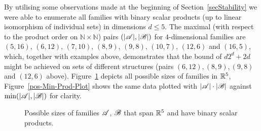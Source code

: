 By utilising some observations made at the beginning of Section~\ref{secStability} we were able to enumerate all families with binary scalar products (up to linear isomorphism of individual sets) in dimensions $d \leq 5$. The maximal (with respect to the product order on $\mathbb{N}\times\mathbb{N}$) pairs $(|{\mathscr{A}}|,|{\mathscr{B}}|)$ for \mbox{$4$-dimensional} families are $(5, 16),\,(6, 12),\,(7, 10),\,(8, 9),\,(9, 8),\,(10, 7),\,(12, 6)$ and $(16, 5)$, which, together with examples above, demonstrates that the bound of $d 2^d + 2d$ might be achieved on sets of different structures (pairs $(6,12), (8,9), (9,8)$ and $(12,6)$ above). Figure~\ref{posSizesPlot} depicts all possible sizes of families in ${\mathbb{R}}^5$, Figure~\ref{pos-Min-Prod-Plot} shows the same data plotted with $|{\mathscr{A}}|\cdot|{\mathscr{B}}|$ against $\operatorname{min}(|{\mathscr{A}}|,|{\mathscr{B}}|)$ for clarity. 

\begin{figure}[!h]
\centering
{}
\caption{Possible sizes of families ${\mathscr{A}}$, ${\mathscr{B}}$ that span ${\mathbb{R}}^5$ and have binary scalar products.}
\label{posSizesPlot}
\end{figure}

